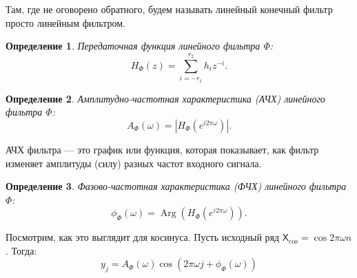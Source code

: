 \documentclass[a4paper, 11pt]{article}
\newcommand{\TS}{\mathsf{X}}
\newtheorem{definition}{Определение} %
\begin{document}
Там, где не оговорено обратного, будем называть линейный конечный фильтр просто линейным фильтром. 

\begin{definition}
	Передаточная функция линейного фильтра $\Phi$:
	\begin{equation*}
		H_{\Phi}(z) = \sum \limits_{i = -r_1}^{r_2} h_i z^{-i}.
	\end{equation*}
\end{definition}

\begin{definition}
	Амплитудно-частотная характеристика (АЧХ) линейного фильтра $\Phi$:
	\begin{equation*}
		A_{\Phi}(\omega) = \left| H_{\Phi}\left(e^{i2\pi\omega}\right) \right|.
	\end{equation*}
\end{definition}

АЧХ фильтра  — это график или функция, которая показывает, как фильтр изменяет амплитуды (силу) разных частот входного сигнала.

\begin{definition}
	Фазово-частотная характеристика (ФЧХ) линейного фильтра $\Phi$:
	\begin{equation*}
		\phi_{\Phi}(\omega) = \operatorname{Arg}\left(H_{\Phi}\left(e^{i2\pi\omega}\right)\right).
	\end{equation*}
\end{definition}

Посмотрим, как это выглядит для косинуса. Пусть исходный ряд $\TS_{\cos} = \cos{2\pi \omega n}$. Тогда:
\begin{equation*}
	y_j = A_{\Phi}(\omega) \cos\left(2\pi\omega j + \phi_{\Phi}(\omega) \right)
\end{equation*}
\end{document}
